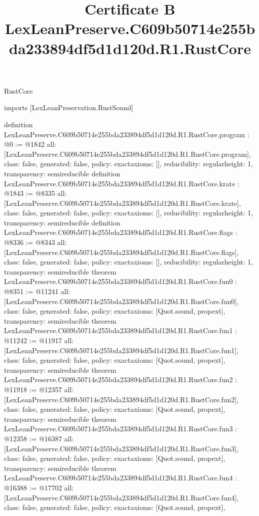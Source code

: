 \begin{lexlean}{RustCore}
\title{Certificate B LexLeanPreserve.C609b50714e255bda233894df5d1d120d.R1.RustCore}
\begin{coremodule}
imports [LexLeanPreservation.RustSound]

definition LexLeanPreserve.C609b50714e255bda233894df5d1d120d.R1.RustCore.program : @0 := @1842 {
  all: [LexLeanPreserve.C609b50714e255bda233894df5d1d120d.R1.RustCore.program],
  class: false,
  generated: false,
  policy: exact{axioms: []},
  reducibility: regular{height: 1},
  transparency: semireducible
}
definition LexLeanPreserve.C609b50714e255bda233894df5d1d120d.R1.RustCore.krate : @1843 := @8335 {
  all: [LexLeanPreserve.C609b50714e255bda233894df5d1d120d.R1.RustCore.krate],
  class: false,
  generated: false,
  policy: exact{axioms: []},
  reducibility: regular{height: 1},
  transparency: semireducible
}
definition LexLeanPreserve.C609b50714e255bda233894df5d1d120d.R1.RustCore.flags : @8336 := @8343 {
  all: [LexLeanPreserve.C609b50714e255bda233894df5d1d120d.R1.RustCore.flags],
  class: false,
  generated: false,
  policy: exact{axioms: []},
  reducibility: regular{height: 1},
  transparency: semireducible
}
theorem LexLeanPreserve.C609b50714e255bda233894df5d1d120d.R1.RustCore.fun0 : @8351 := @11241 {
  all: [LexLeanPreserve.C609b50714e255bda233894df5d1d120d.R1.RustCore.fun0],
  class: false,
  generated: false,
  policy: exact{axioms: [Quot.sound, propext]},
  transparency: semireducible
}
theorem LexLeanPreserve.C609b50714e255bda233894df5d1d120d.R1.RustCore.fun1 : @11242 := @11917 {
  all: [LexLeanPreserve.C609b50714e255bda233894df5d1d120d.R1.RustCore.fun1],
  class: false,
  generated: false,
  policy: exact{axioms: [Quot.sound, propext]},
  transparency: semireducible
}
theorem LexLeanPreserve.C609b50714e255bda233894df5d1d120d.R1.RustCore.fun2 : @11918 := @12357 {
  all: [LexLeanPreserve.C609b50714e255bda233894df5d1d120d.R1.RustCore.fun2],
  class: false,
  generated: false,
  policy: exact{axioms: [Quot.sound, propext]},
  transparency: semireducible
}
theorem LexLeanPreserve.C609b50714e255bda233894df5d1d120d.R1.RustCore.fun3 : @12358 := @16387 {
  all: [LexLeanPreserve.C609b50714e255bda233894df5d1d120d.R1.RustCore.fun3],
  class: false,
  generated: false,
  policy: exact{axioms: [Quot.sound, propext]},
  transparency: semireducible
}
theorem LexLeanPreserve.C609b50714e255bda233894df5d1d120d.R1.RustCore.fun4 : @16388 := @17702 {
  all: [LexLeanPreserve.C609b50714e255bda233894df5d1d120d.R1.RustCore.fun4],
  class: false,
  generated: false,
  policy: exact{axioms: [Quot.sound, propext]},
}
\end{coremodule}
\end{lexlean}
